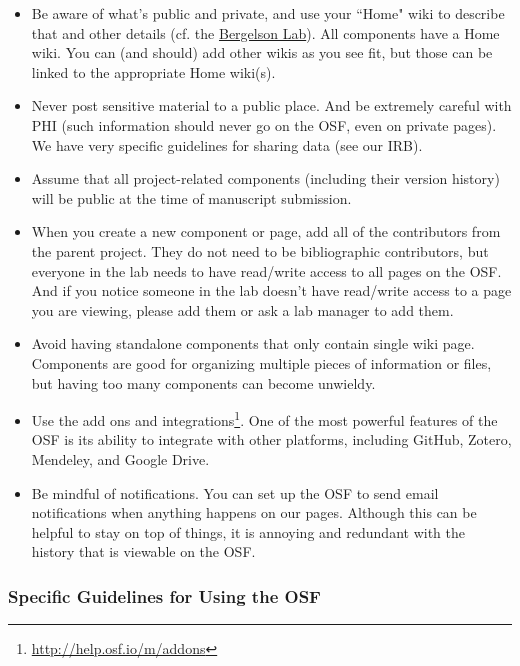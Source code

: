 \documentclass[letterpaper,12pt,oneside]{memoir}
\begin{document}
\begin{itemize}
\item Be aware of what's public and private, and use your ``Home" wiki to describe that and other details (cf. the \href{https://osf.io/3qg96/}{Bergelson Lab}). All components have a Home wiki. You can (and should) add other wikis as you see fit, but those can be linked to the appropriate Home wiki(s).

\item Never post sensitive material to a public place. And be extremely careful with PHI (such information should never go on the OSF, even on private pages). We have very specific guidelines for sharing data (see our IRB). 

\item Assume that all project-related components (including their version history) will be public at the time of manuscript submission. 

\item When you create a new component or page, add all of the contributors from the parent project. They do not need to be bibliographic contributors, but everyone in the lab needs to have read/write access to all pages on the OSF. And if you notice someone in the lab doesn't have read/write access to a page you are viewing, please add them or ask a lab manager to add them. 

\item Avoid having standalone components that only contain single wiki page. Components are good for organizing multiple pieces of information or files, but having too many components can become unwieldy. 

\item Use the add ons and integrations\footnote{\url{http://help.osf.io/m/addons}}. One of the most powerful features of the OSF is its ability to integrate with other platforms, including GitHub, Zotero, Mendeley, and Google Drive. 

\item Be mindful of notifications. You can set up the OSF to send email notifications when anything happens on our pages. Although this can be helpful to stay on top of things, it is annoying and redundant with the history that is viewable on the OSF. 

\end{itemize}

\subsubsection{Specific Guidelines for Using the OSF}
\end{document}
